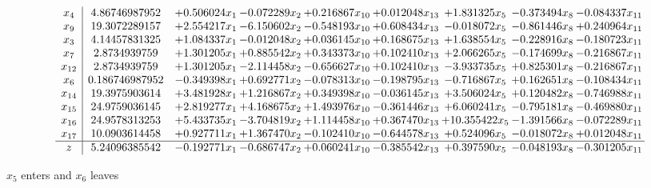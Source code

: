 \documentclass[10pt]{article}
\begin{document}
 \[\begin{array}{c| c c@{\hskip 2pt} c@{\hskip 2pt} c@{\hskip 2pt} c@{\hskip 2pt} c@{\hskip 2pt} c@{\hskip 2pt} c@{\hskip 2pt} }
 x_{4}   &  4.86746987952 & + 0.506024 x_{1} & -0.072289 x_{2} & + 0.216867 x_{10} & + 0.012048 x_{13} & + 1.831325 x_{5} & -0.373494 x_{8} & -0.084337 x_{11}\\
 x_{9}   &  19.3072289157 & + 2.554217 x_{1} & -6.150602 x_{2} & -0.548193 x_{10} & + 0.608434 x_{13} & -0.018072 x_{5} & -0.861446 x_{8} & + 0.240964 x_{11}\\
 x_{3}   &  4.14457831325 & + 1.084337 x_{1} & -0.012048 x_{2} & + 0.036145 x_{10} & + 0.168675 x_{13} & + 1.638554 x_{5} & -0.228916 x_{8} & -0.180723 x_{11}\\
 x_{7}   &  2.8734939759 & + 1.301205 x_{1} & + 0.885542 x_{2} & + 0.343373 x_{10} & + 0.102410 x_{13} & + 2.066265 x_{5} & -0.174699 x_{8} & -0.216867 x_{11}\\
 x_{12}   &  2.8734939759 & + 1.301205 x_{1} & -2.114458 x_{2} & -0.656627 x_{10} & + 0.102410 x_{13} & -3.933735 x_{5} & + 0.825301 x_{8} & -0.216867 x_{11}\\
 x_{6}   &  0.186746987952 & -0.349398 x_{1} & + 0.692771 x_{2} & -0.078313 x_{10} & -0.198795 x_{13} & -0.716867 x_{5} & + 0.162651 x_{8} & -0.108434 x_{11}\\
 x_{14}   &  19.3975903614 & + 3.481928 x_{1} & + 1.216867 x_{2} & + 0.349398 x_{10} & -0.036145 x_{13} & + 3.506024 x_{5} & + 0.120482 x_{8} & -0.746988 x_{11}\\
 x_{15}   &  24.9759036145 & + 2.819277 x_{1} & + 4.168675 x_{2} & + 1.493976 x_{10} & -0.361446 x_{13} & + 6.060241 x_{5} & -0.795181 x_{8} & -0.469880 x_{11}\\
 x_{16}   &  24.9578313253 & + 5.433735 x_{1} & -3.704819 x_{2} & + 1.114458 x_{10} & + 0.367470 x_{13} & + 10.355422 x_{5} & -1.391566 x_{8} & -0.072289 x_{11}\\
 x_{17}   &  10.0903614458 & + 0.927711 x_{1} & + 1.367470 x_{2} & -0.102410 x_{10} & -0.644578 x_{13} & + 0.524096 x_{5} & -0.018072 x_{8} & + 0.012048 x_{11}\\
\hline
z    &  5.24096385542 & -0.192771 x_{1} & -0.686747 x_{2} & + 0.060241 x_{10} & -0.385542 x_{13} & + 0.397590 x_{5} & -0.048193 x_{8} & -0.301205 x_{11}\\
\end{array}\]


 $ x_{5} $ enters and $ x_{6} $ leaves 
\end{document}
